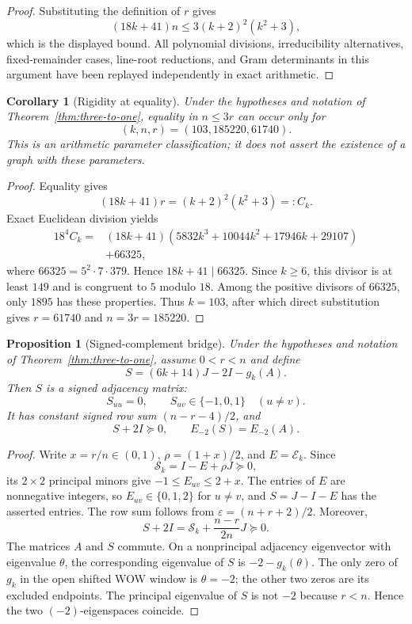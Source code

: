 \documentclass[a4paper,10pt,reqno]{amsart}
\theoremstyle{plain}
\newtheorem{proposition}[theorem]{Proposition}
\newtheorem{corollary}[theorem]{Corollary}
\theoremstyle{definition}
\theoremstyle{remark}
\newcommand{\resultbox}[1]{\boxed{#1}}
\begin{document}
\begin{proof}
 Substituting the definition of \(r\) gives
 \[
  (18k+41)n\le3(k+2)^2(k^2+3),
 \]
 which is the displayed bound.  All polynomial divisions, irreducibility
 alternatives, fixed-remainder cases, line-root reductions, and Gram
 determinants in this argument have been replayed independently in exact
 arithmetic.
\end{proof}

\begin{corollary}[Rigidity at equality]\label{cor:three-to-one-equality}
Under the hypotheses and notation of Theorem~\ref{thm:three-to-one}, equality
in \(n\le3r\) can occur only for
\[
 \resultbox{(k,n,r)=(103,185220,61740).}
\]
This is an arithmetic parameter classification; it does not assert the
existence of a graph with these parameters.
\end{corollary}

\begin{proof}
Equality gives
\[
 (18k+41)r=(k+2)^2(k^2+3)=:C_k.
\]
Exact Euclidean division yields
\[
\begin{aligned}
18^4C_k={}&(18k+41)
 (5832k^3+10044k^2+17946k+29107)\\
&+66325,
\end{aligned}
\]
where \(66325=5^2\cdot7\cdot379\).  Hence \(18k+41\mid66325\).
Since \(k\ge6\), this divisor is at least \(149\) and is congruent to \(5\)
modulo \(18\).  Among the positive divisors of \(66325\), only
\(1895\) has these properties.  Thus \(k=103\), after which direct
substitution gives \(r=61740\) and \(n=3r=185220\).
\end{proof}

\begin{proposition}[Signed-complement bridge]\label{prop:signed-complement}
Under the hypotheses and notation of Theorem~\ref{thm:three-to-one}, assume
\(0<r<n\) and define
\[
 S=(6k+14)J-2I-g_k(A).
\]
Then \(S\) is a signed adjacency matrix:
\[
 S_{uu}=0,\qquad S_{uv}\in\{-1,0,1\}\quad(u\ne v).
\]
It has constant signed row sum \((n-r-4)/2\), and
\[
 S+2I\succeq0,\qquad E_{-2}(S)=E_{-2}(A).
\]
\end{proposition}

\begin{proof}
Write \(x=r/n\in(0,1)\), \(\rho=(1+x)/2\), and
\(E=\mathcal E_k\).  Since
\[
 \mathcal S_k=I-E+\rho J\succeq0,
\]
its \(2\times2\) principal minors give
\(-1\le E_{uv}\le2+x\).  The entries of \(E\) are nonnegative integers, so
\(E_{uv}\in\{0,1,2\}\) for \(u\ne v\), and \(S=J-I-E\) has the asserted
entries.  The row sum follows from
\(\varepsilon=(n+r+2)/2\).  Moreover,
\[
 S+2I
 =\mathcal S_k+\frac{n-r}{2n}J\succeq0.
\]
The matrices \(A\) and \(S\) commute.  On a nonprincipal adjacency
eigenvector with eigenvalue \(\theta\), the corresponding eigenvalue of \(S\)
is \(-2-g_k(\theta)\).  The only zero of \(g_k\) in the open shifted WOW
window is \(\theta=-2\); the other two zeros are its excluded endpoints.
The principal eigenvalue of \(S\) is not \(-2\) because \(r<n\).  Hence the
two \((-2)\)-eigenspaces coincide.
\end{proof}
\end{document}
